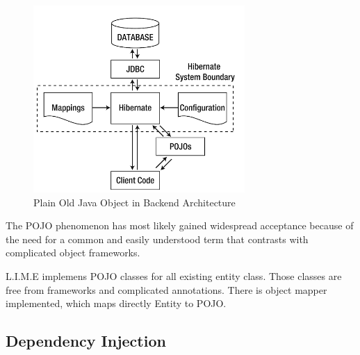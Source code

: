 \documentclass[a4paper,11pt,twoside]{report}
\theoremstyle{definition}
\begin{document}
\begin{figure}[h!]

\begin{center}

\includegraphics[width=\textwidth]{pojo}

\end{center}
\caption{Plain Old Java Object in Backend Architecture}
\end{figure}
 
The POJO phenomenon has most likely gained widespread acceptance because of the need for a common and easily understood term that contrasts with complicated object frameworks.

L.I.M.E implemens POJO classes for all existing entity class. Those classes are free from frameworks and complicated annotations. There is object mapper implemented, which maps directly Entity to POJO.


\subsection{Dependency Injection}
\end{document}
